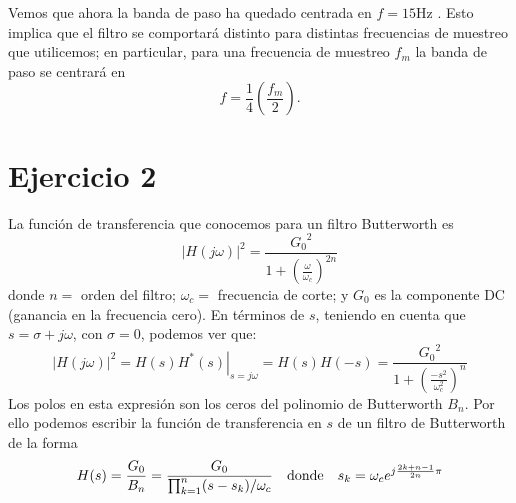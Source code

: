 \documentclass[a4paper]{article}
\begin{document}
Vemos que ahora la banda de paso ha quedado centrada en $f=15$Hz
. Esto implica
que el filtro se comportará distinto para distintas frecuencias de muestreo
que utilicemos; en particular, para una frecuencia de muestreo $f_m$ la banda
de paso se centrará en
$$f=\frac{1}{4}\left(\frac{f_m}{2}\right).$$
\newpage
\section*{Ejercicio 2}
La función de transferencia que conocemos para un filtro Butterworth es
\begin{equation*}
\left| H( j\omega ) \right|^2 = \frac{{G_0}^2}{ 1 + \left(
	\frac{\omega}{\omega_c} \right)^{2n} } 
\end{equation*}
donde $n=$ orden del filtro; $\omega_c=$ frecuencia de corte; y $G_0$ es la
componente DC (ganancia en la frecuencia cero).
En términos de $s$, teniendo en cuenta que $s=\sigma+j\omega$, con $\sigma=0$,
podemos ver que:
\begin{equation*}
|H(j\omega)|^2 = \left. H(s)H^*(s)\right|_{s=j\omega}=H(s)H(-s)
= \frac {{G_0}^2}{1+\left (\frac{-s^2}{\omega_c^2}\right)^n}
\end{equation*}
Los polos en esta expresión son los ceros del polinomio de Butterworth $B_n$.
Por ello podemos escribir la función de transferencia en $s$ de un filtro de
Butterworth de la forma
\begin{equation*}
H(s)=\frac{G_0}{B_n}=\frac{G_0}{\prod_{k=1}^n (s-s_k)/\omega_c}\quad\textrm{donde}
\quad s_k=\omega_c e^{j \frac{2 k +n-1}{2n} \pi}
\end{equation*}
%
\end{document}
